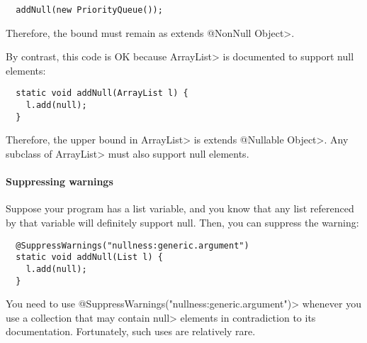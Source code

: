 \begin{Verbatim}
  addNull(new PriorityQueue());
\end{Verbatim}

\noindent
Therefore, the bound must remain as \<extends @NonNull Object>.

By contrast, this code is OK because \<ArrayList> is documented to support
null elements:

\begin{Verbatim}
  static void addNull(ArrayList l) {
    l.add(null);
  }
\end{Verbatim}

\noindent
Therefore, the upper bound in \<ArrayList> is \<extends @Nullable Object>.
Any subclass of \<ArrayList> must also support null elements.










\paragraph{Suppressing warnings}

Suppose your program has a list variable, and you know that any list referenced
by that variable will definitely support null.  Then, you can suppress the
warning:

\begin{Verbatim}
  @SuppressWarnings("nullness:generic.argument")
  static void addNull(List l) {
    l.add(null);
  }
\end{Verbatim}

\noindent
You need to use \<@SuppressWarnings("nullness:generic.argument")>
whenever you use a collection that may contain \<null> elements in
contradiction to its documentation.  Fortunately, such uses are relatively
rare.


